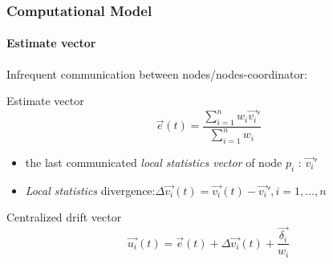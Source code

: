 \documentclass[hyperref={pdfpagelabels=false}]{beamer}
\begin{document}
\begin{frame} \frametitle{Computational Model}\framesubtitle{Estimate vector}
Infrequent communication between nodes/nodes-coordinator:
\begin{block}{Estimate vector}
\begin{equation}
\vec{e}(t)=\frac{\sum_{i=1}^n {w_i \vec{v_i}'}}{\sum_{i=1}^n {w_i}}
\label{form:estimateVector}
\end{equation}
\end{block}
\begin{itemize}
\item the last communicated \emph{local statistics vector} of node $p_i$ : $\vec{v_i}'$
\item \emph{Local statistics} divergence:$\Delta \vec{v_i}(t)=\vec{v_i}(t)-\vec{v_i}', i=1,\dots,n$
\end{itemize}
\begin{block}{Centralized drift vector}
\begin{equation}
\vec{u_i}(t)=\vec{e}(t)+\Delta \vec{v_i}(t)+\frac{\vec{\delta_i}}{w_i}
\label{form:centralizedDrift}
\end{equation} 
\end{block}
\end{frame}
\end{document}
